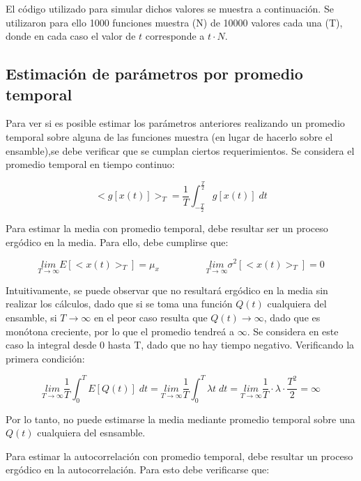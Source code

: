 El c\'odigo utilizado para simular dichos valores se muestra a continuaci\'on. Se utilizaron para ello 1000 funciones muestra (N) de 10000 valores cada una (T), donde en cada caso el valor de $t$ corresponde a $t \cdot N$.



\newpage

\subsection{Estimaci\'on de par\'ametros por promedio temporal}

Para ver si es posible estimar los par\'ametros anteriores realizando un promedio temporal sobre alguna de las funciones muestra (en lugar de hacerlo sobre el ensamble),se debe verificar que se cumplan ciertos requerimientos. Se considera el promedio temporal en tiempo continuo:

\[
<g[x(t)]>_T = \frac{1}{T} \int^{\frac{T}{2}}_{-\frac{T}{2}} g[x(t)] \; dt
\]

Para estimar la media con promedio temporal, debe resultar ser un proceso erg\'odico en la media. Para ello, debe cumplirse que:

\[
\underset{T \rightarrow \infty}{lim} E[<x(t)>_T] = \mu_x \hspace{2cm} \underset{T \rightarrow \infty}{lim} \sigma^2[<x(t)>_T] = 0
\]

Intuitivamente, se puede observar que no resultar\'a erg\'odico en la media sin realizar los c\'alculos, dado que si se toma una funci\'on $Q(t)$ cualquiera del ensamble, si $T \rightarrow \infty$ en el peor caso resulta que $Q(t) \rightarrow \infty$, dado que es mon\'otona creciente, por lo que el promedio tendre\'a a $\infty$. Se considera en este caso la integral desde 0 hasta T, dado que no hay tiempo negativo. Verificando la primera condici\'on:

\[
\underset{T \rightarrow \infty}{lim} \frac{1}{T} \int^{T}_{0} E[Q(t)] \; dt = \underset{T \rightarrow \infty}{lim} \frac{1}{T} \int^{T}_{0} \lambda t \; dt = \underset{T \rightarrow \infty}{lim} \frac{1}{T} \cdot \lambda \cdot \frac{T^2}{2} = \infty
\]

Por lo tanto, no puede estimarse la media mediante promedio temporal sobre una $Q(t)$ cualquiera del esnsamble.\par
Para estimar la autocorrelaci\'on con promedio temporal, debe resultar un proceso erg\'odico en la autocorrelaci\'on. Para esto debe verificarse que:

